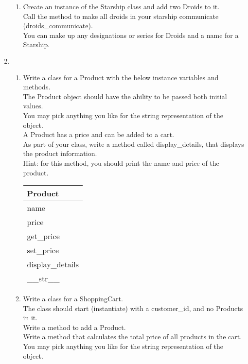 \documentclass{article}
\begin{document}
\begin{enumerate}
\begin{enumerate}
		\item
			Create an instance of the Starship class and add two Droids to it.\\
			Call the method to make all droids in your starship communicate (droids\_communicate).\\
			You can make up any designations or series for Droids and a name for a Starship.\\
	\end{enumerate}
\pagebreak



	\item
	\begin{enumerate}
		\item
			Write a class for a Product with the below instance variables and methods.\\ 
			The Product object should have the ability to be passed both initial values.\\  
			You may pick anything you like for the string representation of the object.\\
			A Product has a price and can be added to a cart.\\  
			As part of your class, write a method called display\_details, that displays the product information.\\
			Hint: for this method, you should print the name and price of the product.
			\begin{flushright}
			\begin{tabular}{|l|}
				\hline
				Product\\ \hline
				name\\	price\\	 \hline
				get\_price \\ set\_price \\ display\_details \\ \_\_str\_\_ \\ \hline
			\end{tabular}
			\end{flushright}

		\item
			Write a class for a ShoppingCart. \\
			The class should start (instantiate) with a customer\_id, and no Products in it. \\ 
			Write a method to add a Product.\\
			Write a method that calculates the total price of all products in the cart.\\
			You may pick anything you like for the string representation of the object.
	

\end{enumerate}
\end{enumerate}
\end{document}
